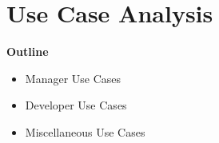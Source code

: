 % 

\section{Use Case Analysis}

\vspace{20mm}

\begin{abstract}
	\blindtext[3]
    
\end{abstract}


\vspace{20mm}

\large{\textbf{Outline}}

\begin{center}
    \begin{itemize}
        \item Manager Use Cases
        \item Developer Use Cases
        \item Miscellaneous Use Cases
    \end{itemize}
\end{center}
\pagebreak